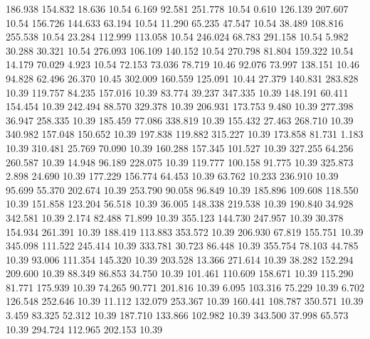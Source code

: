  186.938  154.832   18.636        10.54
   6.169   92.581  251.778        10.54
   0.610  126.139  207.607        10.54
 156.726  144.633   63.194        10.54
  11.290   65.235   47.547        10.54
  38.489  108.816  255.538        10.54
  23.284  112.999  113.058        10.54
 246.024   68.783  291.158        10.54
   5.982   30.288   30.321        10.54
 276.093  106.109  140.152        10.54
 270.798   81.804  159.322        10.54
  14.179   70.029    4.923        10.54
  72.153   73.036   78.719        10.46
  92.076   73.997  138.151        10.46
  94.828   62.496   26.370        10.45
 302.009  160.559  125.091        10.44
  27.379  140.831  283.828        10.39
 119.757   84.235  157.016        10.39
  83.774   39.237  347.335        10.39
 148.191   60.411  154.454        10.39
 242.494   88.570  329.378        10.39
 206.931  173.753    9.480        10.39
 277.398   36.947  258.335        10.39
 185.459   77.086  338.819        10.39
 155.432   27.463  268.710        10.39
 340.982  157.048  150.652        10.39
 197.838  119.882  315.227        10.39
 173.858   81.731    1.183        10.39
 310.481   25.769   70.090        10.39
 160.288  157.345  101.527        10.39
 327.255   64.256  260.587        10.39
  14.948   96.189  228.075        10.39
 119.777  100.158   91.775        10.39
 325.873    2.898   24.690        10.39
 177.229  156.774   64.453        10.39
  63.762   10.233  236.910        10.39
  95.699   55.370  202.674        10.39
 253.790   90.058   96.849        10.39
 185.896  109.608  118.550        10.39
 151.858  123.204   56.518        10.39
  36.005  148.338  219.538        10.39
 190.840   34.928  342.581        10.39
   2.174   82.488   71.899        10.39
 355.123  144.730  247.957        10.39
  30.378  154.934  261.391        10.39
 188.419  113.883  353.572        10.39
 206.930   67.819  155.751        10.39
 345.098  111.522  245.414        10.39
 333.781   30.723   86.448        10.39
 355.754   78.103   44.785        10.39
  93.006  111.354  145.320        10.39
 203.528   13.366  271.614        10.39
  38.282  152.294  209.600        10.39
  88.349   86.853   34.750        10.39
 101.461  110.609  158.671        10.39
 115.290   81.771  175.939        10.39
  74.265   90.771  201.816        10.39
   6.095  103.316   75.229        10.39
   6.702  126.548  252.646        10.39
  11.112  132.079  253.367        10.39
 160.441  108.787  350.571        10.39
   3.459   83.325   52.312        10.39
 187.710  133.866  102.982        10.39
 343.500   37.998   65.573        10.39
 294.724  112.965  202.153        10.39
